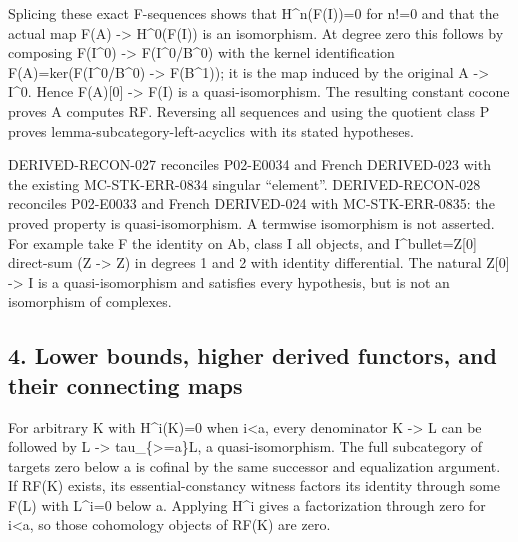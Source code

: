 \documentclass[11pt]{article}
\begin{document}
Splicing these exact F-sequences shows that H\textasciicircum{}n(F(I)\allowbreak{})\allowbreak{}\allowbreak{}=0 for n!\allowbreak{}=0 and that the actual map F(A)\allowbreak{} \allowbreak{}-> H\textasciicircum{}0(F(I)\allowbreak{})\allowbreak{} is an isomorphism. At degree zero this follows by composing F(I\textasciicircum{}0)\allowbreak{} \allowbreak{}-> F(I\textasciicircum{}0/\allowbreak{}B\textasciicircum{}0)\allowbreak{} with the kernel identification F(A)\allowbreak{}\allowbreak{}=ker(F(I\textasciicircum{}0/\allowbreak{}B\textasciicircum{}0)\allowbreak{} \allowbreak{}-> F(B\textasciicircum{}1)\allowbreak{})\allowbreak{}; it is the map induced by the original A \allowbreak{}-> I\^{}0. Hence F(A)\allowbreak{}[0]\allowbreak{} \allowbreak{}-> F(I)\allowbreak{} is a quasi-isomorphism. The resulting constant cocone proves A computes RF. Reversing all sequences and using the quotient class P proves lemma-subcategory-left-acyclics with its stated hypotheses.

DERIVED-RECON-027 reconciles P02-E0034 and French DERIVED-023 with the existing MC-STK-ERR-0834 singular ``element''. DERIVED-RECON-028 reconciles P02-E0033 and French DERIVED-024 with MC-STK-ERR-0835:\allowbreak{} the proved property is quasi-isomorphism. A termwise isomorphism is not asserted. For example take F the identity on Ab,\allowbreak{} class I all objects,\allowbreak{} and I\textasciicircum{}bullet\allowbreak{}=Z[0]\allowbreak{} direct-sum (Z \allowbreak{}-> Z)\allowbreak{} in degrees 1 and 2 with identity differential. The natural Z[0]\allowbreak{} \allowbreak{}-> I is a quasi-isomorphism and satisfies every hypothesis,\allowbreak{} but is not an isomorphism of complexes.

\subsection{\texorpdfstring{4. Lower bounds,\allowbreak{} higher derived functors,\allowbreak{} and their connecting maps}{4. Lower  higher derived  and their connecting maps}}\label{proofs-5091-5900-lower-bounds-higher-derived-functors-and-their-connecting-maps}

For arbitrary K with H\textasciicircum{}i(K)\allowbreak{}\allowbreak{}=0 when i<a,\allowbreak{} every denominator K \allowbreak{}-> L can be followed by L \allowbreak{}-> tau\_\allowbreak{}\{>\allowbreak{}=a\}L,\allowbreak{} a quasi-isomorphism. The full subcategory of targets zero below a is cofinal by the same successor and equalization argument. If RF(K)\allowbreak{} exists,\allowbreak{} its essential-constancy witness factors its identity through some F(L)\allowbreak{} with L\textasciicircum{}i\allowbreak{}=0 below a. Applying H\^{}i gives a factorization through zero for i<a,\allowbreak{} so those cohomology objects of RF(K)\allowbreak{} are zero.
\end{document}
